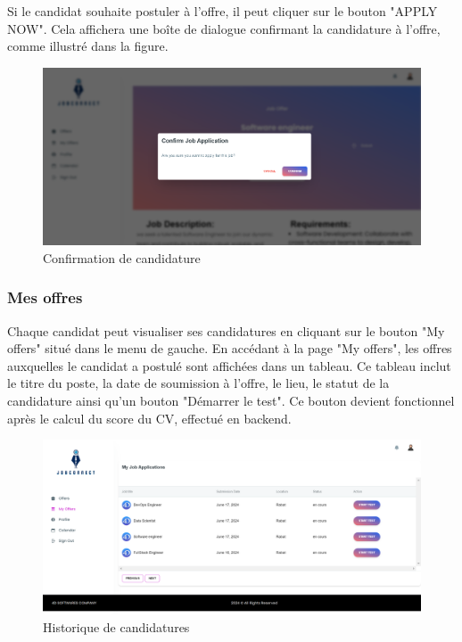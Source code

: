 Si le candidat souhaite postuler à l'offre, il peut cliquer 
sur le  bouton "APPLY NOW". Cela affichera une boîte de 
dialogue confirmant la candidature à l'offre, comme illustré
 dans la figure.
\newline

\begin{figure}[htbp]
   \centering
   \includegraphics[scale=0.2]{screens/confirmJob2.png} 
   \caption{Confirmation de candidature}
   \label{fig:listOffers}
\end{figure}

\subsubsection{Mes offres}
Chaque candidat peut visualiser ses candidatures en cliquant sur le bouton "My offers" situé dans le  menu de  gauche. En accédant à la page "My offers", les  offres auxquelles le  candidat a postulé sont affichées dans un tableau. Ce  tableau inclut le titre du poste, la date de  soumission à l'offre, le  lieu, le  statut de la candidature ainsi qu'un bouton "Démarrer le test". 
Ce  bouton devient fonctionnel après le calcul du score du CV, effectué en backend.  
\begin{figure}[htbp]
   \centering
   \includegraphics[scale=0.2]{screens/myofffers.png} 
   \caption{Historique de candidatures}
   \label{fig:listOffers}
\end{figure}

